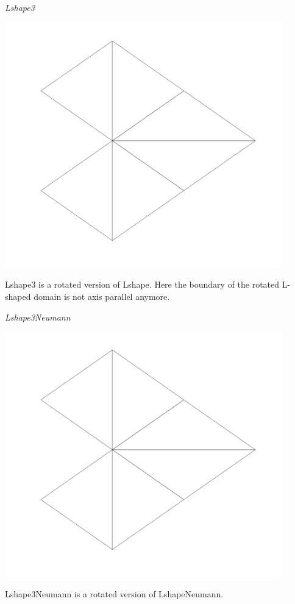 \noindent\emph{Lshape3}\smallskip\\
\begin{minipage}{0.14\textwidth}
\includegraphics[width=0.9\textwidth]{images/sect_ImplementedProblems_Lshape3.pdf}
\end{minipage}
\begin{minipage}{0.85\textwidth}
Lshape3 is a rotated version of Lshape. Here the boundary of the rotated L-shaped domain is not axis parallel anymore.
\end{minipage}
\bigskip

\noindent\emph{Lshape3Neumann}\smallskip\\
\begin{minipage}{0.14\textwidth}
\includegraphics[width=0.9\textwidth]{images/sect_ImplementedProblems_Lshape3.pdf}
\end{minipage}
\begin{minipage}{0.85\textwidth}
Lshape3Neumann is a rotated version of LshapeNeumann.
\end{minipage}
\bigskip

